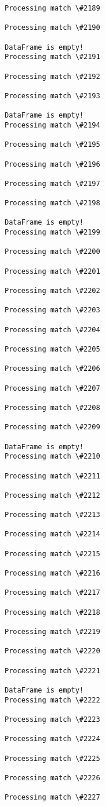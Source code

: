 \documentclass[11pt]{article}
\begin{document}
\begin{Verbatim}[commandchars=\\\{\}]
Processing match \#2189

Processing match \#2190

DataFrame is empty!
Processing match \#2191

Processing match \#2192

Processing match \#2193

DataFrame is empty!
Processing match \#2194

Processing match \#2195

Processing match \#2196

Processing match \#2197

Processing match \#2198

DataFrame is empty!
Processing match \#2199

Processing match \#2200

Processing match \#2201

Processing match \#2202

Processing match \#2203

Processing match \#2204

Processing match \#2205

Processing match \#2206

Processing match \#2207

Processing match \#2208

Processing match \#2209

DataFrame is empty!
Processing match \#2210

Processing match \#2211

Processing match \#2212

Processing match \#2213

Processing match \#2214

Processing match \#2215

Processing match \#2216

Processing match \#2217

Processing match \#2218

Processing match \#2219

Processing match \#2220

Processing match \#2221

DataFrame is empty!
Processing match \#2222

Processing match \#2223

Processing match \#2224

Processing match \#2225

Processing match \#2226

Processing match \#2227


\end{Verbatim}
\end{document}
